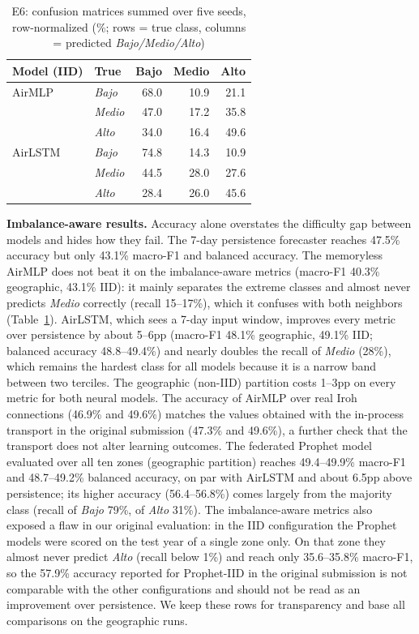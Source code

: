\begin{table}[t]
\centering
\caption{E6: confusion matrices summed over five seeds, row-normalized (\%; rows = true class, columns = predicted \textit{Bajo/Medio/Alto})}
\label{tab:e6cm}
\scriptsize
\setlength{\tabcolsep}{3pt}
\begin{tabular}{@{}l l r r r@{}}
\toprule
\textbf{Model (IID)} & \textbf{True} & \textbf{Bajo} & \textbf{Medio} & \textbf{Alto} \\
\midrule
AirMLP  & \textit{Bajo}  & 68.0 & 10.9 & 21.1 \\
        & \textit{Medio} & 47.0 & 17.2 & 35.8 \\
        & \textit{Alto}  & 34.0 & 16.4 & 49.6 \\
\midrule
AirLSTM & \textit{Bajo}  & 74.8 & 14.3 & 10.9 \\
        & \textit{Medio} & 44.5 & 28.0 & 27.6 \\
        & \textit{Alto}  & 28.4 & 26.0 & 45.6 \\
\bottomrule
\end{tabular}
\end{table}

\textbf{Imbalance-aware results.} Accuracy alone overstates the difficulty gap between models and hides how they fail. The 7-day persistence forecaster reaches 47.5\% accuracy but only 43.1\% macro-F1 and balanced accuracy. The memoryless AirMLP does not beat it on the imbalance-aware metrics (macro-F1 40.3\% geographic, 43.1\% IID): it mainly separates the extreme classes and almost never predicts \textit{Medio} correctly (recall 15--17\%), which it confuses with both neighbors (Table~\ref{tab:e6cm}). AirLSTM, which sees a 7-day input window, improves every metric over persistence by about 5--6pp (macro-F1 48.1\% geographic, 49.1\% IID; balanced accuracy 48.8--49.4\%) and nearly doubles the recall of \textit{Medio} (28\%), which remains the hardest class for all models because it is a narrow band between two terciles. The geographic (non-IID) partition costs 1--3pp on every metric for both neural models. The accuracy of AirMLP over real Iroh connections (46.9\% and 49.6\%) matches the values obtained with the in-process transport in the original submission (47.3\% and 49.6\%), a further check that the transport does not alter learning outcomes. The federated Prophet model evaluated over all ten zones (geographic partition) reaches 49.4--49.9\% macro-F1 and 48.7--49.2\% balanced accuracy, on par with AirLSTM and about 6.5pp above persistence; its higher accuracy (56.4--56.8\%) comes largely from the majority class (recall of \textit{Bajo} 79\%, of \textit{Alto} 31\%). The imbalance-aware metrics also exposed a flaw in our original evaluation: in the IID configuration the Prophet models were scored on the test year of a single zone only. On that zone they almost never predict \textit{Alto} (recall below 1\%) and reach only 35.6--35.8\% macro-F1, so the 57.9\% accuracy reported for Prophet-IID in the original submission is not comparable with the other configurations and should not be read as an improvement over persistence. We keep these rows for transparency and base all comparisons on the geographic runs.

